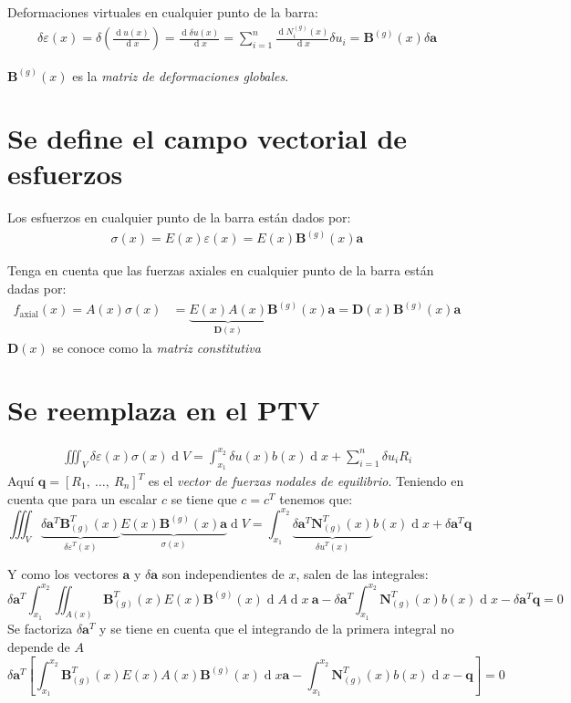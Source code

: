 \documentclass[12pt,letterpaper,landscape]{article}
\newcommand{\ve}[1]{{\boldsymbol{#1}}}
\newcommand{\ma}[1]{{\boldsymbol{#1}}}
\newcommand{\dd}{\operatorname{d} \!}
\begin{document}
Deformaciones virtuales  en cualquier punto de la barra:
\begin{align}
\delta \varepsilon(x) = \delta \left(\frac{\dd u(x)}{\dd x}\right) = \frac{\dd \delta u(x)}{\dd x} = \sum_{i=1}^n \frac{\dd N_i^{(g)}(x)}{\dd x} \delta u_i =
\ma{B}^{(g)}(x) \delta \ve{a}
\end{align}

$\ma{B}^{(g)}(x)$ es la \emph{matriz de deformaciones globales}.

\newpage

\section{Se define el campo vectorial de esfuerzos}
Los esfuerzos en cualquier punto de la barra están dados por:
\begin{align}
\sigma(x) = E(x) \varepsilon(x) = E(x) \ma{B}^{(g)}(x) \ve{a}
\end{align}

Tenga en cuenta que las fuerzas axiales en cualquier punto de la barra están dadas por:
\begin{align}
f_{\text{axial}}(x) = A(x) \sigma(x) &= \underbrace{E(x) A(x)}_{\ma{D}(x)} \ma{B}^{(g)}(x)
\ve{a} = \ma{D}(x) \ma{B}^{(g)}(x) \ve{a}
\end{align}
$\ma{D}(x)$ se conoce como la \emph{matriz constitutiva}

\newpage
\section{Se reemplaza en el PTV}
\begin{align}
\iiint_{V} \delta\varepsilon(x) \sigma(x) \dd V = \int_{x_1}^{x_2} \delta u(x) b(x) \dd x + \sum_{i=1}^n \delta u_i R_i
\end{align}
Aquí $\ve{q} = [R_1,\ \ldots,\ R_n]^T$ es el \emph{vector de fuerzas nodales de equilibrio}. Teniendo en cuenta que para un escalar $c$ se tiene que $c = c^T$ tenemos que:
\begin{equation}
\iiint_{V} \underbrace{\delta \ve{a}^T \ma{B}_{(g)}^T(x)}_{\delta\varepsilon^T(x)} \underbrace{E(x) \ma{B}^{(g)}(x) \ve{a}}_{\sigma(x)} \dd V = \int_{x_1}^{x_2} \underbrace{\delta \ve{a}^T \ma{N}_{(g)}^T(x)}_{\delta u^T(x)} b(x) \dd x +
\delta \ma{a}^T \ma{q}
\end{equation}

Y como los vectores $\ve{a}$ y $\delta \ve{a}$  son independientes de $x$, salen de las integrales:
\begin{equation}
\delta \ve{a}^T \int_{x_1}^{x_2} \iint_{A(x)}  \ma{B}_{(g)}^T(x) E(x) \ma{B}^{(g)}(x) \dd A \dd x\ \ve{a} - \delta \ve{a}^T \int_{x_1}^{x_2}  \ma{N}_{(g)}^T(x) b(x) \dd x 
- \delta \ma{a}^T \ma{q} = 0
\end{equation}
Se factoriza $\delta \ma{a}^T$ y se tiene en cuenta que el integrando de la primera integral no depende de $A$
\begin{equation}
\delta \ve{a}^T 
\left[ \int_{x_1}^{x_2} \ma{B}_{(g)}^T(x) E(x) A(x) \ma{B}^{(g)}(x) \dd x \ve{a}
%
- \int_{x_1}^{x_2}  \ma{N}_{(g)}^T(x) b(x) \dd x 
- \ma{q}\right] = 0
\end{equation}
\end{document}
